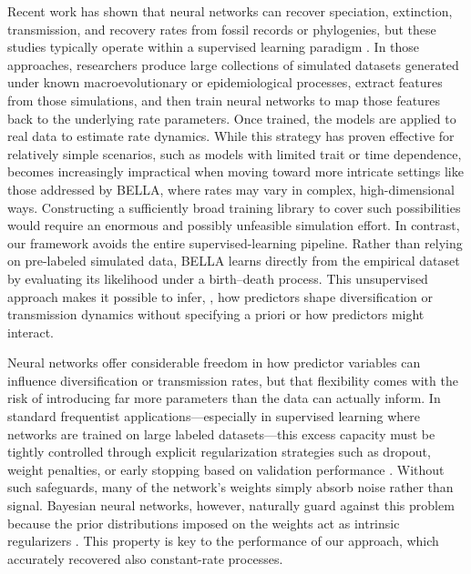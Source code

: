 Recent work has shown that neural networks can recover speciation, extinction, transmission, and recovery rates from fossil records or phylogenies, but these studies typically operate within a supervised learning paradigm \cite{thompson2024deep, lambert2023deep, silvestro2020450, voznica2022deep, xie2024integrating, kocakova2025global, pena2025utility}.
In those approaches, researchers produce large collections of simulated datasets generated under known macroevolutionary or epidemiological processes, extract features from those simulations, and then train neural networks to map those features back to the underlying rate parameters.
Once trained, the models are applied to real data to estimate rate dynamics.
While this strategy has proven effective for relatively simple scenarios, such as models with limited trait or time dependence,   becomes increasingly impractical when moving toward more intricate settings like those addressed by BELLA, where rates may vary in complex, high-dimensional ways.
Constructing a sufficiently broad training library to cover such possibilities would require an enormous and possibly unfeasible simulation effort.
In contrast, our framework avoids the entire supervised-learning pipeline.
Rather than relying on pre-labeled simulated data, BELLA learns directly from the empirical dataset by evaluating its likelihood under a birth–death process.
This unsupervised approach makes it possible to infer, , how predictors shape diversification or transmission dynamics without specifying a priori  or how predictors might interact.

Neural networks offer considerable freedom in how predictor variables can influence diversification or transmission rates, but that flexibility comes with the risk of introducing far more parameters than the data can actually inform.
In standard frequentist applications---especially in supervised learning where networks are trained on large labeled datasets---this excess capacity must be tightly controlled through explicit regularization strategies such as dropout, weight penalties, or early stopping based on validation performance \cite{lecun2015deep}.
Without such safeguards, many of the network’s weights simply absorb noise rather than signal.
Bayesian neural networks, however, naturally guard against this problem because the prior distributions imposed on the weights act as intrinsic regularizers \cite{silvestro2020prior, hauffe2024trait}.
This property is key to the performance of our approach, which accurately recovered also constant-rate processes. 

